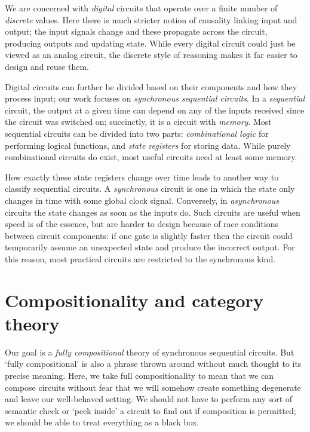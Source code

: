 We are concerned with \emph{digital} circuits that operate over a finite
number of \emph{discrete} values.
Here there is much stricter notion of causality linking input and output; the
input signals change and these propagate across the circuit, producing outputs
and updating state.
While every digital circuit could just be viewed as an analog circuit, the
discrete style of reasoning makes it far easier to design and reuse them.

\begin{center}
\end{center}

Digital circuits can further be divided based on their components and how they
process input; our work focuses on \emph{synchronous sequential circuits}.
In a \emph{sequential} circuit, the output at a given time can depend on any of
the inputs received since the circuit was switched on; succinctly, it is a
circuit with \emph{memory}.
Most sequential circuits can be divided into two parts:
\emph{combinational logic} for performing logical functions, and
\emph{state registers} for storing data.
While purely combinational circuits do exist, most useful circuits need
at least some memory.

How exactly these state registers change over time leads to another way
to classify sequential circuits.
A \emph{synchronous} circuit is one in which the state only changes in time with
some global clock signal.
Conversely, in \emph{asynchronous} circuits the state changes as soon as the
inputs do.
Such circuits are useful when speed is of the essence, but are harder to design
because of race conditions between circuit components: if one gate is slightly
faster then the circuit could temporarily assume an unexpected state and produce
the incorrect output.
For this reason, most practical circuits are restricted to the synchronous
kind.

\section{Compositionality and category theory}

Our goal is a \emph{fully compositional} theory of synchronous sequential
circuits.
But `fully compositional' is also a phrase thrown around without much thought to
its precise meaning.
Here, we take full compositionality to mean that we can compose circuits
without fear that we will somehow create something degenerate and leave our
well-behaved setting.
We should not have to perform any sort of semantic check or `peek inside' a
circuit to find out if composition is permitted; we should be able to treat
everything as a black box.

